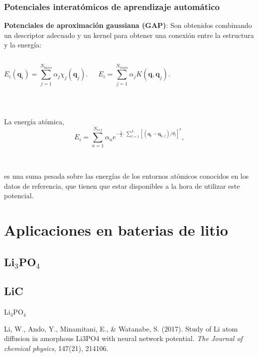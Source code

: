 \documentclass[aspectratio=169]{beamer}
\let\oldtextbf\textbf
\renewcommand{\textbf}[1]{\textcolor{nordblue}{\oldtextbf{#1}}}
\begin{document}
    \begin{frame}
        \frametitle{Potenciales interatómicos de aprendizaje automático}
        
        \textbf{Potenciales de aproximación gaussiana (GAP)}: Son obtenidos 
        combinando un descriptor adecuado y un kernel para obtener una conexión 
        entre la estructura y la energía:

        \begin{columns}
            $$
            E_i(\mathbf{q}_i) = \sum_{j=1}^{N_{basis}} \alpha_j \chi_j(\mathbf{q}_j).
            $$

            $$
            E_i = \sum_{j=1}^{N_{train}} \alpha_j K(\mathbf{q}, \mathbf{q}_j).
            $$
        \end{columns}

        \ \pause

        La energía atómica,
        $$
        E_i  = \sum_{n=1}^{N_{ref}} \alpha_n e^{-\frac{1}{2}\cdot\sum_{l=1}^L [(\mathbf{q}_l - \mathbf{q}_{n,l}) / \theta_l]^2},
        $$

        \ \pause

        es una suma pesada sobre las energías de los entornos atómicos conocidos
        en los datos de referencia, que tienen que estar disponibles a la hora
        de utilizar este potencial.

    \end{frame}

    \section{Aplicaciones en baterias de litio}

    \subsection{Li$_3$PO$_4$}
    \subsection{LiC}
    \begin{frame}
        \begin{center}
            {\huge Li$_3$PO$_4$}
        \end{center}
        \tiny{
            Li, W., Ando, Y., Minamitani, E., \& Watanabe, S. (2017). 
            Study of Li atom diffusion in amorphous Li3PO4 with neural 
            network potential. \textit{The Journal of chemical physics}, 
            147(21), 214106.
        }
    \end{frame}
\end{document}
